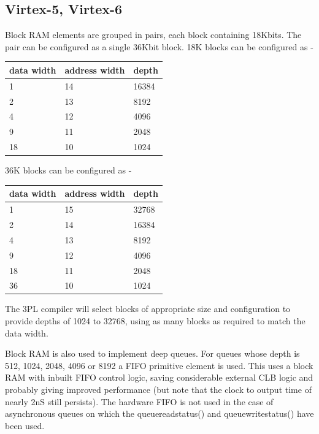         \subsection{Virtex-5, Virtex-6}
        
            Block RAM elements are grouped in pairs, each block containing
            18Kbits. The pair can be configured as a single 36Kbit block.
            18K blocks can be configured as - 
            
            \begin{tabular}{l l l}
            data width & address width & depth \\
            \hline
            1  & 14 & 16384 \\
            2  & 13 & 8192 \\
            4  & 12 & 4096 \\
            9  & 11 & 2048 \\
            18 & 10 & 1024 \\
            \end{tabular}

            36K blocks can be configured as - 
            
            \begin{tabular}{l l l}
            data width & address width & depth \\
            \hline
            1  & 15 & 32768 \\
            2  & 14 & 16384 \\
            4  & 13 & 8192  \\
            9  & 12 & 4096  \\
            18 & 11 & 2048  \\
            36 & 10 & 1024  \\
            \end{tabular}
            
            The 3PL compiler will select blocks of appropriate size and
            configuration to provide depths of 1024 to 32768, using as many
            blocks as required to match the data width.

            Block RAM is also used to implement deep queues. For queues whose
            depth is 512, 1024, 2048, 4096 or 8192 a FIFO primitive element is
            used. This uses a block RAM with inbuilt FIFO control logic, saving
            considerable external CLB logic and probably giving improved
            performance (but note that the clock to output time of nearly 2nS
            still persists). The hardware FIFO is not used in the case of
            asynchronous queues on which the queuereadstatus() and
            queuewritestatus() have been used.

